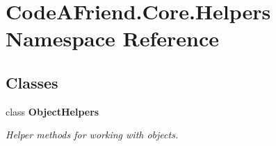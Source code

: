 \hypertarget{namespace_code_a_friend_1_1_core_1_1_helpers}{}\section{Code\+A\+Friend.\+Core.\+Helpers Namespace Reference}
\label{namespace_code_a_friend_1_1_core_1_1_helpers}
\subsection*{Classes}
\begin{DoxyCompactItemize}
\item 
class {\bfseries Object\+Helpers}
\begin{DoxyCompactList}\small\item\em Helper methods for working with objects. \end{DoxyCompactList}\end{DoxyCompactItemize}
